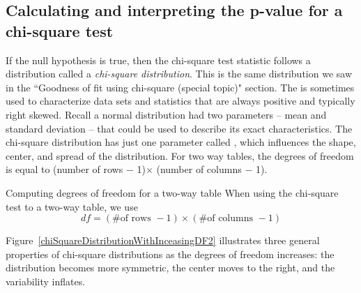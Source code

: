 \subsection{Calculating and interpreting the p-value for a chi-square test}

If the null hypothesis is true, then the chi-square test statistic follows a distribution called a \emph{chi-square distribution}. This is the same distribution we saw in the ``Goodness of fit using chi-square (special topic)" section.  The  is sometimes used to characterize data sets and statistics that are always positive and typically right skewed. Recall a normal distribution had two parameters -- mean and standard deviation -- that could be used to describe its exact characteristics. The chi-square distribution has just one parameter called , which influences the shape, center, and spread of the distribution.  For two way tables, the degrees of freedom is equal to (number of rows $-$ 1)$\times$ (number of columns $-$ 1).



\begin{onebox}{Computing degrees of freedom for a two-way table}
When using the chi-square test to a two-way table, we use
$$ df = (\text{\# of rows }-1)\times (\text{\# of columns }-1) $$
\end{onebox}
%


Figure~\ref{chiSquareDistributionWithInceasingDF2} illustrates three general properties of chi-square distributions as the degrees of freedom increases:  the distribution becomes more symmetric, the center moves to the right, and the variability inflates.

